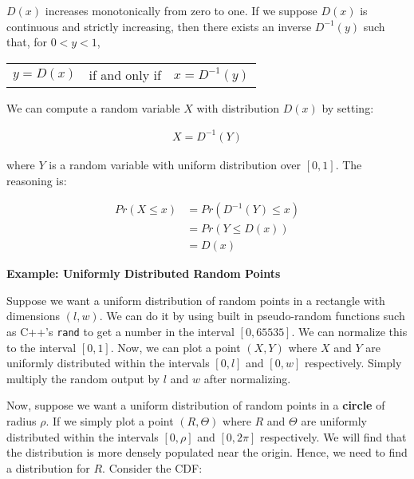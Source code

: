 \documentclass[11pt]{article}
\begin{document}
\(D\left( x \right)\) increases monotonically from zero to one. If we suppose \(D\left( x \right)\) is continuous and strictly increasing, then there exists an inverse \(D^{-1}\left( y \right)\) such that, for \(0 < y < 1\),

\begin{center}
    \begin{tabular}{ c c c }
        $y = D\left( x \right)$ & if and only if & $x = D^{-1}\left( y \right)$
    \end{tabular}
\end{center}

We can compute a random variable \(X\) with distribution \(D\left( x \right)\) by setting:

\begin{align*}
    X = D^{-1}\left( Y \right)
\end{align*}

where \(Y\) is a random variable with uniform distribution over \(\left[0, 1\right]\). The reasoning is:

\begin{align*}
    Pr\left( X \leq x \right) &= Pr\left( D^{-1}\left(Y\right) \leq x \right) \\
    &= Pr\left(Y \leq D\left( x \right)\right) \\
    &= D\left( x \right)
\end{align*}

\textbf{Example: Uniformly Distributed Random Points}

Suppose we want a uniform distribution of random points in a rectangle with dimensions \(\left(l,w\right)\). We can do it by using built in pseudo-random functions such as C++'s \texttt{rand} to get a number in the interval \(\left[0,65535\right]\). We can normalize this to the interval \(\left[0,1\right]\). Now, we can plot a point \(\left(X,Y\right)\) where \(X\) and \(Y\) are uniformly distributed within the intervals \(\left[0,l\right]\) and \(\left[0,w\right]\) respectively. Simply multiply the random output by \(l\) and \(w\) after normalizing.

Now, suppose we want a uniform distribution of random points in a \textbf{circle} of radius \(\rho\). If we simply plot a point \(\left(R,\Theta\right)\) where \(R\) and \(\Theta\) are uniformly distributed within the intervals \(\left[0,\rho\right]\) and \(\left[0,2\pi\right]\) respectively. We will find that the distribution is more densely populated near the origin. Hence, we need to find a distribution for \(R\). Consider the CDF:
\end{document}
